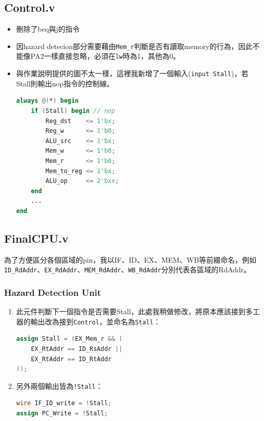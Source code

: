 \documentclass[12pt]{article}
\begin{document}
\subsection{Control.v}
\begin{itemize}
    \item 刪除了beq與j的指令
    \item 因hazard detecion部分需要藉由\texttt{Mem\_r}判斷是否有讀取memory的行為，因此不能像PA2一樣直接忽略，必須在\texttt{lw}時為1，其他為0。
    \item 與作業說明提供的圖不太一樣，這裡我新增了一個輸入(\texttt{input Stall})，若Stall則輸出nop指令的控制線。
    \begin{lstlisting}[language=Verilog]
always @(*) begin
    if (Stall) begin // nop
        Reg_dst    <= 1'bx;
        Reg_w      <= 1'b0;
        ALU_src    <= 1'bx;
        Mem_w      <= 1'b0;
        Mem_r      <= 1'b0;
        Mem_to_reg <= 1'bx;
        ALU_op     <= 2'bxx;
    end
    ...
end
    \end{lstlisting}
\end{itemize}




\subsection{FinalCPU.v}
為了方便區分各個區域的pin，我以IF、ID、EX、MEM、WB等前綴命名，例如\texttt{ID\_RdAddr}、\texttt{EX\_RdAddr}、\texttt{MEM\_RdAddr}、\texttt{WB\_RdAddr}分別代表各區域的RdAddr。
\subsubsection{Hazard Detection Unit}
\begin{enumerate}
    \item 此元件判斷下一個指令是否需要Stall，此處我稍做修改，將原本應該接到多工器的輸出改為接到\texttt{Control}，並命名為\texttt{Stall}：
    \begin{lstlisting}[language=Verilog]
assign Stall = (EX_Mem_r && (
    EX_RtAddr == ID_RsAddr ||
    EX_RtAddr == ID_RtAddr
));
    \end{lstlisting}
    \item 另外兩個輸出皆為\texttt{!Stall}：
    \begin{lstlisting}[language=Verilog]
wire IF_ID_write = !Stall;
assign PC_Write = !Stall;
    \end{lstlisting}
\end{enumerate}
\end{document}
